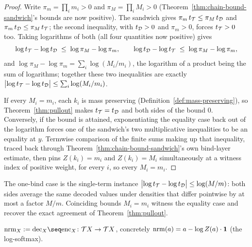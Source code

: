 \begin{proof}
\leanok
Write $\pi_m = \prod_i m_i > 0$ and $\pi_M = \prod_i M_i > 0$
(Theorem~\ref{thm:chain-bound-sandwich}'s bounds are now positive). The
sandwich gives $\pi_m\, t_{\mathcal T} \le \pi_M\, t_{\mathcal D}$ and
$\pi_m\, t_{\mathcal D} \le \pi_M\, t_{\mathcal T}$; the second inequality, with
$t_{\mathcal D} > 0$ and $\pi_m > 0$, forces $t_{\mathcal T} > 0$ too. Taking
logarithms of both (all four quantities now positive) gives
\[
  \log t_{\mathcal T} - \log t_{\mathcal D} \;\le\; \log\pi_M - \log\pi_m,
  \qquad
  \log t_{\mathcal D} - \log t_{\mathcal T} \;\le\; \log\pi_M - \log\pi_m,
\]
and $\log\pi_M - \log\pi_m = \sum_i \log(M_i/m_i)$, the logarithm of a
product being the sum of logarithms; together these two inequalities
are exactly $\bigl|\log t_{\mathcal T} - \log t_{\mathcal D}\bigr| \le \sum_i
\log(M_i/m_i)$.

If every $M_i = m_i$, each $k_i$ is mass preserving
(Definition~\ref{def:mass-preserving}), so Theorem~\ref{thm:pullout}
makes $t_{\mathcal T} = t_{\mathcal D}$ and both sides of the bound $0$.
Conversely, if the bound is attained, exponentiating the equality case
back out of the logarithm forces one of the sandwich's two
multiplicative inequalities to be an equality at $y$. Termwise
comparison of the finite sums making up that inequality, traced back
through Theorem~\ref{thm:chain-bound-sandwich}'s own bind-layer
estimate, then pins $Z(k_i) = m_i$ and $Z(k_i) = M_i$ simultaneously at
a witness index of positive weight, for every $i$, so every
$M_i = m_i$.
\end{proof}

The one-bind case is the single-term instance
$\bigl|\log t_{\mathcal T} - \log t_{\mathcal D}\bigr| \le \log(M/m)$: both sides
average the same decoded values under densities that differ pointwise
by at most a factor $M/m$. Coinciding bounds $M_i = m_i$ witness the
equality case and recover the exact agreement of
Theorem~\ref{thm:pullout}.

\begin{definition}[Normalizer]
\label{def:normalizer}
\leanok
$\nrm_X := \dec_X \seq \enc_X \colon \Tmon X \to \Tmon X$, concretely
$\mathrm{nrm}(a) = a - \log Z(a)\cdot\mathbf 1$ (the log-softmax).
\end{definition}


